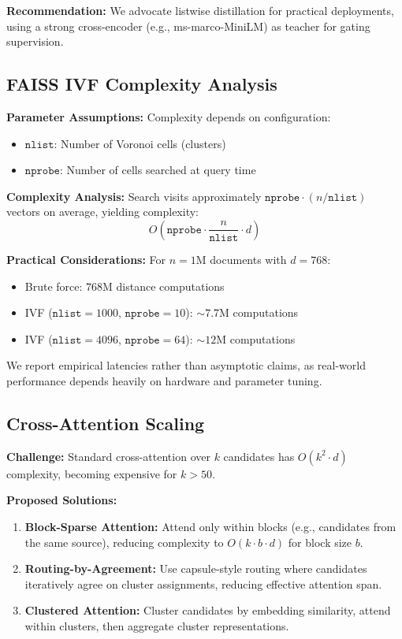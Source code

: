 \documentclass[11pt,a4paper]{article}
\begin{document}
\textbf{Recommendation:} We advocate listwise distillation for practical deployments, using a strong cross-encoder (e.g., ms-marco-MiniLM) as teacher for gating supervision.

\subsection{FAISS IVF Complexity Analysis}
\label{sec:faiss_complexity}

\textbf{Parameter Assumptions:} Complexity depends on configuration:
\begin{itemize}
    \item $\texttt{nlist}$: Number of Voronoi cells (clusters)
    \item $\texttt{nprobe}$: Number of cells searched at query time
\end{itemize}

\textbf{Complexity Analysis:} Search visits approximately $\texttt{nprobe} \cdot (n / \texttt{nlist})$ vectors on average, yielding complexity:
\begin{equation}
O\left(\texttt{nprobe} \cdot \frac{n}{\texttt{nlist}} \cdot d\right)
\end{equation}

\textbf{Practical Considerations:} For $n = 1$M documents with $d = 768$:
\begin{itemize}
    \item Brute force: $768$M distance computations
    \item IVF ($\texttt{nlist}=1000$, $\texttt{nprobe}=10$): $\sim 7.7$M computations
    \item IVF ($\texttt{nlist}=4096$, $\texttt{nprobe}=64$): $\sim 12$M computations
\end{itemize}

We report empirical latencies rather than asymptotic claims, as real-world performance depends heavily on hardware and parameter tuning.

\subsection{Cross-Attention Scaling}
\label{sec:cross_attention_scaling}

\textbf{Challenge:} Standard cross-attention over $k$ candidates has $O(k^2 \cdot d)$ complexity, becoming expensive for $k > 50$.

\textbf{Proposed Solutions:}
\begin{enumerate}
    \item \textbf{Block-Sparse Attention:} Attend only within blocks (e.g., candidates from the same source), reducing complexity to $O(k \cdot b \cdot d)$ for block size $b$.
    
    \item \textbf{Routing-by-Agreement:} Use capsule-style routing \citep{sabour2017dynamic} where candidates iteratively agree on cluster assignments, reducing effective attention span.
    
    \item \textbf{Clustered Attention:} Cluster candidates by embedding similarity, attend within clusters, then aggregate cluster representations.
\end{enumerate}
\end{document}
